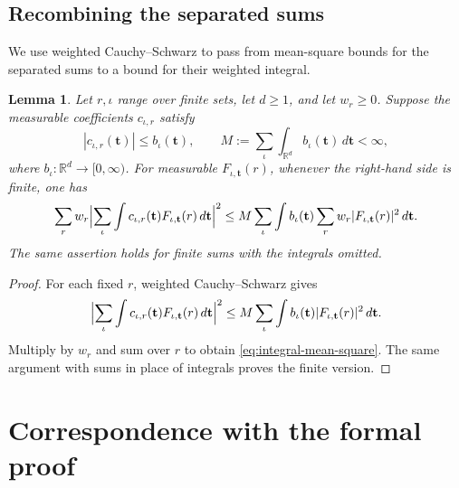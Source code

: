 \documentclass[11pt,a4paper]{article}
\numberwithin{equation}{section}
\numberwithin{figure}{section}
\newtheorem{lemma}[theorem]{Lemma}
\theoremstyle{definition}
\theoremstyle{remark}
\newcommand{\dd}{\,d}
\begin{document}
\subsection{Recombining the separated sums}
We use weighted Cauchy--Schwarz to pass from mean-square bounds
for the separated sums to a bound for their weighted integral.

\begin{lemma}\label{lem:recombine}
Let $r,\iota$ range over finite sets, let $d\ge1$, and let $w_r\ge0$.
Suppose the measurable coefficients $c_{\iota,r}$ satisfy
\[
 |c_{\iota,r}(\mathbf t)|\le b_\iota(\mathbf t),\qquad
 M:=\sum_\iota\int_{\mathbb R^d}b_\iota(\mathbf t)\dd\mathbf t<\infty,
\]
where $b_\iota:\mathbb R^d\to[0,\infty)$.
For measurable $F_{\iota,\mathbf t}(r)$, whenever the right-hand
side is finite, one has
\begin{equation}\label{eq:integral-mean-square}
 \sum_r w_r\Bigl|\sum_\iota\int c_{\iota,r}(\mathbf t)
 F_{\iota,\mathbf t}(r)\dd\mathbf t\Bigr|^2
 \le M\sum_\iota\int b_\iota(\mathbf t)
       \sum_r w_r|F_{\iota,\mathbf t}(r)|^2\dd\mathbf t.
\end{equation}
The same assertion holds for finite sums with the integrals omitted.
\end{lemma}
\begin{proof}
For each fixed $r$, weighted Cauchy--Schwarz gives
\[
 \Bigl|\sum_\iota\int c_{\iota,r}(\mathbf t)
 F_{\iota,\mathbf t}(r)\dd\mathbf t\Bigr|^2
 \le M\sum_\iota\int b_\iota(\mathbf t)
 |F_{\iota,\mathbf t}(r)|^2\dd\mathbf t.
\]
Multiply by $w_r$ and sum over $r$ to obtain
\eqref{eq:integral-mean-square}. The same argument with sums in
place of integrals proves the finite version.
\end{proof}

\section{Correspondence with the formal proof}\label{app:lean}
\end{document}
